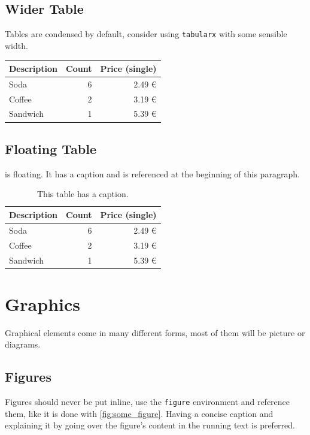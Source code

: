 \subsection{Wider Table}

Tables are condensed by default, consider using \texttt{tabularx} with some sensible width.

\begin{center}
\begin{tabularx}{0.75\textwidth}{Xrr}
	\toprule
	Description & Count & Price (single)\\
	\midrule
	Soda & 6 & 2.49 €\\
	Coffee & 2 & 3.19 €\\
	Sandwich & 1 & 5.39 €\\
	\bottomrule
\end{tabularx}
\end{center}

\subsection{Floating Table}

 is floating.
It has a caption and is referenced at the beginning of this paragraph.

\begin{table}
	\centering
	\begin{tabularx}{0.75\textwidth}{Xrr}
		\toprule
		Description & Count & Price (single)\\
		\midrule
		Soda & 6 & 2.49 €\\
		Coffee & 2 & 3.19 €\\
		Sandwich & 1 & 5.39 €\\
		\bottomrule
	\end{tabularx}
	\caption{This table has a caption.}
	\label{tbl:some_table}
\end{table}

\section{Graphics}

Graphical elements come in many different forms, most of them will be picture or diagrams.

\subsection{Figures}

Figures should never be put inline, use the \texttt{figure} environment and reference them, like it is done with \cref{fig:some_figure}.
Having a concise caption and explaining it by going over the figure's content in the running text is preferred.

